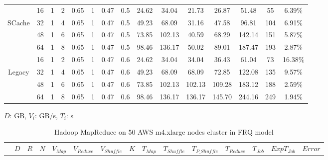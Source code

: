 {\begin{table}[!t]
\begin{tabular}{|c||c|c|c|c|c|c|c||c|c|c|c|c|c|c|}
\hline
 & 16	& 1	& 2 &	0.65 &	1 &	0.47 &	0.5 &	24.62 &		34.04	 &	21.73 &	26.87 &	51.48	& 55  &		6.39\% \\
 SCache
 & 32	& 1	& 4 &	0.65 &	1 &	0.47 &	0.5 &	49.23 &		68.09	 &	31.16 &	47.58 &	96.81	& 104 & 	6.91\% \\
 & 48	& 1	& 6 &	0.65 &	1 &	0.47 &	0.5 &	73.85 &		102.13 &	40.59 &	68.29 &	142.14	& 151 & 	5.87\% \\
 & 64	& 1	& 8 &	0.65 &	1 &	0.47 &	0.5 &	98.46 &		136.17 &	50.02 &	89.01 &	187.47	& 193 & 	2.87\% \\
 \hline
 & 16	& 1 & 2 &	0.65 &	1 &	0.47 &	0.6 &	24.62 &		34.04	&	34.04	&	36.43	&	61.04	&	73	&	16.38\%	\\
 Legacy
 & 32	& 1 & 4 &	0.65 &	1 &	0.47 &	0.6 &	49.23 &		68.09	&	68.09	&	72.85	&	122.08	&	135	&	9.57\%	\\
 & 48	& 1 & 6 &	0.65 &	1 &	0.47 &	0.6 &	73.85 &		102.13	&	102.13	&	109.28	&	183.12	&	188	&	2.59\%	\\
 & 64	& 1 & 8 &	0.65 &	1 &	0.47 &	0.6 &	98.46 &		136.17	&	136.17	&	145.70	&	244.16	&	249	&	1.94\%	\\
\hline
\end{tabular}
\end{table}

\begin{table}[!t]

\renewcommand{\arraystretch}{1.3}
\caption{\color{blue}Hadoop MapReduce on 50 AWS m4.xlarge nodes cluster in FRQ model}
\label{table2}
\centering
\(D\): GB, \(V_{i}\): GB/s, \(T_{i}\): s
\begin{tabular}{|c||c|c|c|c|c|c|c||c|c|c|c|c|c|c|}
\hline
 &
\(D\) &	
\(R\) &	
\(N\) &	
\(V_{Map}\) &	
\(V_{Reduce}\) &	
\(V_{Shuffle}\) &	
\(K\) &	
\(T_{Map}\) &	
\(T_{Shuffle}\) &	
\(T_{P\_Shuffle}\) &
\(T_{Reduce}\) & 
\(T_{Job}\) & 
\(Exp T_{Job}\) &
\(Error\)\\


\end{tabular}
\end{table}}

